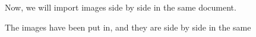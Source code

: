 \documentclass[a4paper,12pt]{extarticle}
\begin{document}
Now, we will import images side by side in the same document.
\newpage
\vspace*{0.5cm}
\begin{figure}
\CommonHeightRow
{\begin{floatrow}
 \hspace{1cm}
\end{floatrow}}
\end{figure}
\vspace{-1cm}
The images have been put in, and they are side by side in the same
\end{document}
